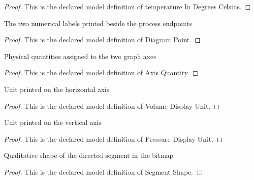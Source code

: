 \begin{proof}
  This is the declared model definition of temperature In Degrees Celsius.
\end{proof}
\begin{definition}
  \label{def:physics:phyx-mini-0362:phyxminiproblems-problemphyxmini0362-diagrampoint}
  The two numerical labels printed beside the process endpoints
\end{definition}
\begin{proof}
  This is the declared model definition of Diagram Point.
\end{proof}
\begin{definition}
  \label{def:physics:phyx-mini-0362:phyxminiproblems-problemphyxmini0362-axisquantity}
  Physical quantities assigned to the two graph axes
\end{definition}
\begin{proof}
  This is the declared model definition of Axis Quantity.
\end{proof}
\begin{definition}
  \label{def:physics:phyx-mini-0362:phyxminiproblems-problemphyxmini0362-volumedisplayunit}
  Unit printed on the horizontal axis
\end{definition}
\begin{proof}
  This is the declared model definition of Volume Display Unit.
\end{proof}
\begin{definition}
  \label{def:physics:phyx-mini-0362:phyxminiproblems-problemphyxmini0362-pressuredisplayunit}
  Unit printed on the vertical axis
\end{definition}
\begin{proof}
  This is the declared model definition of Pressure Display Unit.
\end{proof}
\begin{definition}
  \label{def:physics:phyx-mini-0362:phyxminiproblems-problemphyxmini0362-segmentshape}
  Qualitative shape of the directed segment in the bitmap
\end{definition}
\begin{proof}
  This is the declared model definition of Segment Shape.
\end{proof}
